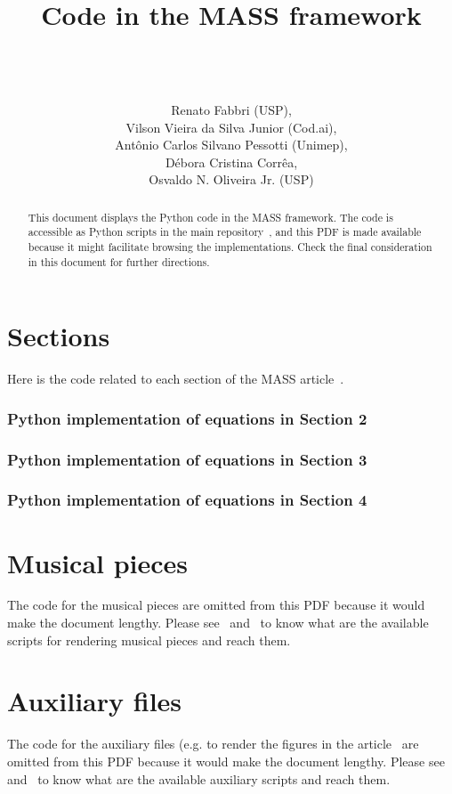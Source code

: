 \documentclass{article}
\newcommand{\code}[2]{





 \subsubsection*{#1}
 
}
\begin{document}
\title{Code in the MASS framework}
\author{\\\\\\ Renato Fabbri (USP),\\
Vilson Vieira da Silva Junior (Cod.ai),\\
Ant\^onio Carlos Silvano Pessotti (Unimep),\\
D\'ebora Cristina Corr\^ea,\\
Osvaldo N. Oliveira Jr. (USP)
}

\maketitle

\begin{abstract}
This document displays the Python code in the MASS
framework.
The code is accessible as Python scripts in the main repository~\cite{massRepo},
and this PDF is made available because it might facilitate
browsing the implementations.
Check the final consideration in this document for further directions.
\end{abstract}

\section{Sections}
Here is the code related to each section of the MASS article~\cite{massArticle}.

% 
\code{Python implementation of equations in Section 2}{../src/sections/2.py}

\clearpage
\code{Python implementation of equations in Section 3}{../src/sections/3.py}

\clearpage
\code{Python implementation of equations in Section 4}{../src/sections/4.py}

\clearpage
\section{Musical pieces}
The code for the musical pieces are omitted from this PDF because
it would make the document lengthy.
Please see~\cite{massListings} and~\cite{massRepo}
to know what are the available scripts for rendering musical pieces
and reach them.

\section{Auxiliary files}
The code for the auxiliary files (e.g. to render the figures in the article~\cite{massArticle}
are omitted from this PDF because
it would make the document lengthy.
Please see~\cite{massListings} and~\cite{massRepo}
to know what are the available auxiliary scripts
and reach them.
\end{document}
